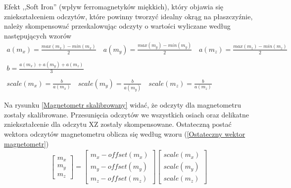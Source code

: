Efekt ,,Soft Iron'' (wpływ ferromagnetyków miękkich), który objawia się zniekształceniem odczytów, które powinny tworzyć idealny okrąg na płaszczyźnie, należy skompensować przeskalowując odczyty o wartości wyliczane według następujących wzorów
$$
    \begin{array}{c}
        a(m_x) = \frac{max(m_x) - min(m_x)}{2}
        \quad
        a(m_y) = \frac{max(m_y) - min(m_y)}{2}
        \quad
        a(m_z) = \frac{max(m_z) - min(m_z)}{2} \\ \\
        b = \frac{a(m_x) + a(m_y) + a(m_z)}{3} \\ \\
        scale(m_x) = \frac{b}{a(m_x)}
        \quad
        scale(m_y) = \frac{b}{a(m_y)}
        \quad
        scale(m_z) = \frac{b}{a(m_z)} 
    \end{array}
$$

Na rysunku \ref{Magnetometr skalibrowany} widać, że odczyty dla magnetometru zostały skalibrowane. Przesunięcia odczytów we wszystkich osiach oraz delikatne zniekształcenie dla odczytu XZ zostały skompensowane. Ostateczną postać wektora odczytów magnetometru oblicza się według wzoru (\ref{Ostateczny wektor magnetometr})
\begin{equation}
    \begin{array}{c}
        \left[
            \begin{array}{c}
                m_x \\
                m_y \\
                m_z
            \end{array}
        \right]
        =
        \left[
            \begin{array}{c}
                m_x - offset(m_x) \\
                m_y - offset(m_y) \\
                m_z - offset(m_z)
            \end{array}
        \right]
        \left[
            \begin{array}{c}
                scale(m_x) \\
                scale(m_y) \\
                scale(m_z)
            \end{array}
        \right]
    \end{array}
    \label{Ostateczny wektor magnetometr}
\end{equation}

